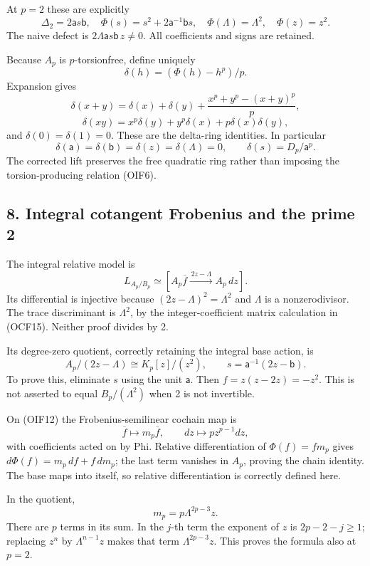 \documentclass[
]{article}
\begin{document}
At \(p=2\) these are explicitly \[
\Delta_2=2\mathsf a s\mathsf b,\quad
\Phi(s)=s^2+2\mathsf a^{-1}\mathsf b s,\quad
\Phi(\Lambda)=\Lambda^2,\quad\Phi(z)=z^2.
\tag{OIF9}
\] The naive defect is \(2\Lambda\mathsf a s\mathsf b\,z\ne0\). All
coefficients and signs are retained.

Because \(A_p\) is \(p\)-torsionfree, define uniquely \[
\delta(h)=(\Phi(h)-h^p)/p.
\tag{OIF10}
\] Expansion gives \[
\delta(x+y)=\delta(x)+\delta(y)
+\frac{x^p+y^p-(x+y)^p}{p},
\] \[
\delta(xy)=x^p\delta(y)+y^p\delta(x)+p\delta(x)\delta(y),
\] and \(\delta(0)=\delta(1)=0\). These are the delta-ring identities.
In particular \[
\delta(\mathsf a)=\delta(\mathsf b)=\delta(z)=\delta(\Lambda)=0,
\qquad \delta(s)=D_p/\mathsf a^p.
\tag{OIF11}
\] The corrected lift preserves the free quadratic ring rather than
imposing the torsion-producing relation (OIF6).

\subsection{8. Integral cotangent Frobenius and the prime
2}\label{integral-cotangent-frobenius-and-the-prime-2}

The integral relative model is \[
L_{A_p/B_p}\simeq
[A_p\overline f\xrightarrow{\,2z-\Lambda\,}A_p\,dz].
\tag{OIF12}
\] Its differential is injective because \((2z-\Lambda)^2=\Lambda^2\)
and \(\Lambda\) is a nonzerodivisor. The trace discriminant is
\(\Lambda^2\), by the integer-coefficient matrix calculation in (OCF15).
Neither proof divides by 2.

Its degree-zero quotient, correctly retaining the integral base action,
is \[
A_p/(2z-\Lambda)\cong K_p[z]/(z^2),
\qquad s=\mathsf a^{-1}(2z-\mathsf b).
\tag{OIF13}
\] To prove this, eliminate \(s\) using the unit \(\mathsf a\). Then
\(f=z(z-2z)=-z^2\). This is not asserted to equal \(B_p/(\Lambda^2)\)
when 2 is not invertible.

On (OIF12) the Frobenius-semilinear cochain map is \[
\overline f\mapsto m_p\overline f,\qquad
dz\mapsto pz^{p-1}dz,
\tag{OIF14}
\] with coefficients acted on by Phi. Relative differentiation of
\(\Phi(f)=fm_p\) gives \(d\Phi(f)=m_p\,df+f\,dm_p\); the last term
vanishes in \(A_p\), proving the chain identity. The base maps into
itself, so relative differentiation is correctly defined here.

In the quotient, \[
m_p=p\Lambda^{2p-3}z.
\tag{OIF15}
\] There are \(p\) terms in its sum. In the \(j\)-th term the exponent
of \(z\) is \(2p-2-j\ge1\); replacing \(z^n\) by \(\Lambda^{n-1}z\)
makes that term \(\Lambda^{2p-3}z\). This proves the formula also at
\(p=2\).
\end{document}
